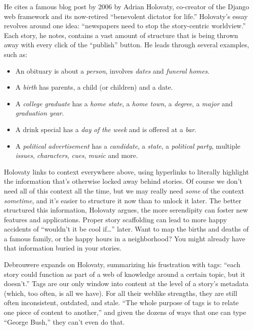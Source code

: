 He cites a famous blog post by 2006 by Adrian Holovaty, co-creator of the Django web framework and its now-retired ``benevolent dictator for life.'' Holovaty's essay revolves around one idea: ``newspapers need to stop the story-centric worldview.''\autocite{holovaty_fundamental_2006} Each story, he notes, contains a vast amount of structure that is being thrown away with every click of the ``publish'' button. He leads through several examples, such as: \begin{itemize}
\item An obituary is about a \emph{person}, involves \emph{dates} and \emph{funeral homes}.
\item A \emph{birth} has parents, a child (or children) and a date.
\item A \emph{college graduate} has a \emph{home state}, a \emph{home town}, a \emph{degree}, a \emph{major} and \emph{graduation year}.
\item A drink special has a \emph{day of the week} and is offered at a \emph{bar}.
\item A \emph{political advertisement} has a \emph{candidate}, a \emph{state}, a \emph{political party}, multiple \emph{issues}, \emph{characters}, \emph{cues}, \emph{music} and more.\end{itemize}

\noindent Holovaty links to context everywhere above, using hyperlinks to literally highlight the information that's otherwise locked away behind stories. Of course we don't need all of this context all the time, but we may really need \emph{some} of the context \emph{sometime}, and it's easier to structure it now than to unlock it later. The better structured this information, Holovaty argues, the more serendipity can foster new features and applications. Proper story scaffolding can lead to more happy accidents of ``wouldn't it be cool if\ldots'' later. Want to map the births and deaths of a famous family, or the happy hours in a neighborhood? You might already have that information buried in your stories.

Debrouwere expands on Holovaty, summarizing his frustration with tags: ``each story could function as part of a web of knowledge around a certain topic, but it doesn't.'' Tags are our only window into content at the level of a story's metadata (which, too often, is all we have). For all their weblike strengths, they are still often inconsistent, outdated, and stale. ``The whole purpose of tags is to relate one piece of content to another,'' and given the dozens of ways that one can type ``George Bush,'' they can't even do that.

